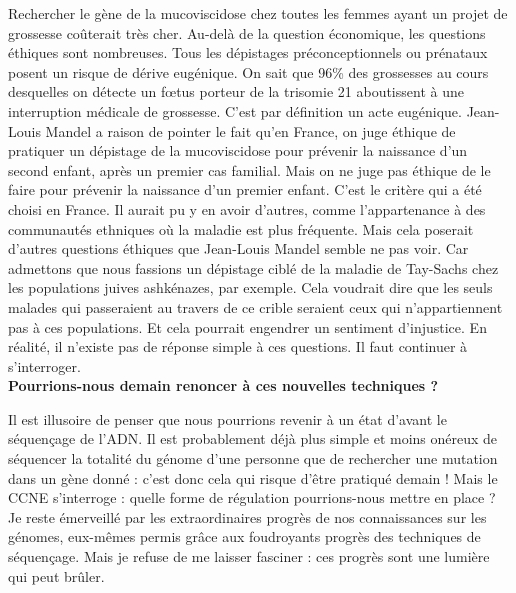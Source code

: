 \documentclass[8pt]{article}
\begin{document}
Rechercher le gène de la mucoviscidose chez toutes les femmes ayant un projet de grossesse coûterait très cher. Au-delà de la question économique, les questions éthiques sont nombreuses. Tous les dépistages préconceptionnels ou prénataux posent un risque de dérive eugénique. On sait que 96\% des grossesses au cours desquelles on détecte un fœtus porteur de la trisomie 21 aboutissent à une interruption médicale de grossesse. C’est par définition un acte eugénique. Jean-Louis Mandel a raison de pointer le fait qu’en France, on juge éthique de pratiquer un dépistage de la mucoviscidose pour prévenir la naissance d’un second enfant, après un premier cas familial. Mais on ne juge pas éthique de le faire pour prévenir la naissance d’un premier enfant. C’est le critère qui a été choisi en France. Il aurait pu y en avoir d’autres, comme l’appartenance à des communautés ethniques où la maladie est plus fréquente. Mais cela poserait d’autres questions éthiques que Jean-Louis Mandel semble ne pas voir. Car admettons que nous fassions un dépistage ciblé de la maladie de Tay-Sachs chez les populations juives ashkénazes, par exemple. Cela voudrait dire que les seuls malades qui passeraient au travers de ce crible seraient ceux qui n’appartiennent pas à ces populations. Et cela pourrait engendrer un sentiment d’injustice. En réalité, il n’existe pas de réponse simple à ces questions. Il faut continuer à s’interroger. \\

\textbf{Pourrions-nous demain renoncer à ces nouvelles techniques ?}

Il est illusoire de penser que nous pourrions revenir à un état d’avant le séquençage de l’ADN. Il est probablement déjà plus simple et moins onéreux de séquencer la totalité du génome d’une personne que de rechercher une mutation dans un gène donné : c’est donc cela qui risque d’être pratiqué demain ! Mais le CCNE s’interroge : quelle forme de régulation pourrions-nous mettre en place ? Je reste émerveillé par les extraordinaires progrès de nos connaissances sur les génomes, eux-mêmes permis grâce aux foudroyants progrès des techniques de séquençage. Mais je refuse de me laisser fasciner : ces progrès sont une lumière qui peut brûler.
\end{document}
